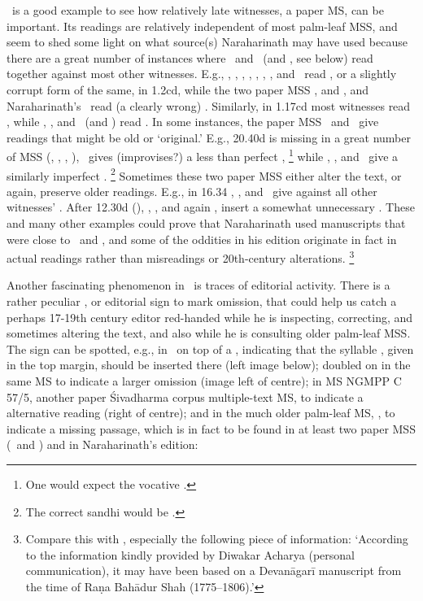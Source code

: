 \msPaperA\ is a good example to see how relatively
late witnesses, a paper MS, can be important. Its readings
are relatively independent of most palm-leaf MSS,
and seem to shed some light on what source(s) 
Naraharinath may have used because there
are a great number of instances where \Ed\ and \msPaperA\
(and \msPaperC, see below) 
read together against most other witnesses. E.g., \msCa, \msCb, \msCc, \msNa, \msNb, \msNc, \msNd, 
and \M\ read \skt{bhāratasaṃhitām}, or a slightly
corrupt form of the same, in 1.2cd, while the two
paper MSS \msPaperA, and \msPaperC, 
and Naraharinath's \Ed\ read (a clearly wrong)
. Similarly, in 1.17cd most
witnesses read , while 
\msPaperA, \msPaperC, and \Ed\ (and \M) read
. In some instances, the paper
MSS \msPaperA\ and \msPaperC\ give readings
that might be old or `original.' E.g., 20.40d is missing
in a great number of MSS (\msCa, \msCb, \msNa, \msNb),
\msNc\ gives (improvises?) a less than perfect 
,%
		 \footnote{One would expect the vocative
		 				.}
while \msPaperA, \msPaperC, and \Ed\ give a similarly imperfect
.%
		 \footnote{The correct sandhi would be
		 				.}
Sometimes these two paper MSS either alter
the text, or again, preserve older readings. 
E.g., in 16.34 \msPaperA, \msPaperC, and \Ed\
give  against all other witnesses'
\skt{maheśvara uvāca}. After 12.30d (),
\msPaperA, \msPaperC, and again \Ed, insert
a somewhat unnecessary \skt{vipula uvāca}. These
and many other examples could prove that
Naraharinath used manuscripts that were close
to \msPaperA\ and \msPaperC,\label{narahari_paperms}
and some of the oddities in his edition originate in fact in 
actual readings rather than misreadings or
20th-century alterations.%
		\footnote{Compare this with 	
					, especially the
					following piece of information:
					`According to the information kindly
					provided by Diwakar Acharya (personal communication),
					it may have been based on a Devanāgarī manuscript 	
					from the time of Raṇa Bahādur Shah (1775--1806).'}

Another fascinating phenomenon in \msPaperA\ is
traces of editorial activity. There is a rather
peculiar \skt{kākapada}, or editorial sign to mark
omission, that could help us catch a perhaps
17-19th century editor red-handed while he is inspecting,
correcting, and sometimes altering the text, and 
also while he is consulting older palm-leaf MSS.
The sign can be spotted, e.g., in \msPaperA\
on top of a , indicating that the syllable , 
given in the top margin,
should be inserted there (left image below); 
doubled on in the same MS to indicate
a larger omission (image left of centre); 
in MS NGMPP C 57/5, another paper Śivadharma corpus
multiple-text MS, to indicate a
alternative reading (right of centre);
and in the much older palm-leaf
MS, \msNa, to indicate a missing passage,
which is in fact to be found in at least two paper MSS 
(\msPaperA\ and \msPaperC) and in Naraharinath's
edition:

